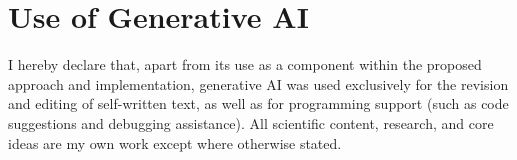 \documentclass[
  numbers=noenddot,
  english,  %
  a4paper,  %
  oneside,  %
  bibliography=totoc,
  headsepline,
  cleardoublepage=empty,
  parskip=half,
  draft=false
]{scrbook}
\theoremstyle{break}
\begin{document}
\bigskip

\section*{Use of Generative AI}

I hereby declare that, apart from its use as a component within the proposed approach and implementation, generative AI was used exclusively for the revision and editing of self-written text, as well as for programming support (such as code suggestions and debugging assistance). All scientific content, research, and core ideas are my own work except where otherwise stated.

\clearpage
\pagestyle{empty}
\renewcommand*{\chapterpagestyle}{empty}
\Versicherung
\end{document}
